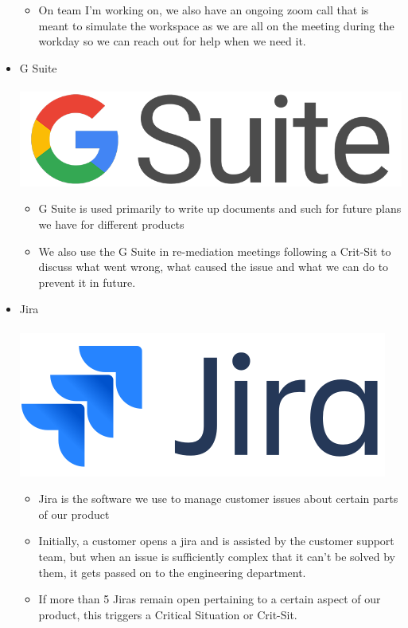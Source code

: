 \documentclass[11pt]{article} %
\begin{document}
\begin{itemize}
\begin{itemize}
\item On team I'm working on,  we also have an ongoing zoom call that is meant to simulate the workspace as we are all on the meeting during the workday so we can reach out for help when we need it.
\end{itemize}
\item G Suite \\\\
\includegraphics[scale=0.1]{gsuite.png}
\begin{itemize}
\item G Suite is used primarily to write up documents and such for future plans we have for different products
\item We also use the G Suite in re-mediation meetings following a Crit-Sit to discuss what went wrong, what caused the issue and what we can do to prevent it in future.  
\end{itemize}
\item Jira \\\\
\includegraphics[scale=0.14]{jira.png}
\begin{itemize}
\item Jira is the software we use to manage customer issues about certain parts of our product
\item Initially,  a customer opens a jira and is assisted by the customer support team,  but when an issue is sufficiently complex that it can't be solved by them,  it gets passed on to the engineering department.
\item If more than 5 Jiras remain open pertaining to a certain aspect of our product,  this triggers a Critical Situation or Crit-Sit. 
\end{itemize}

\end{itemize}
\end{document}
